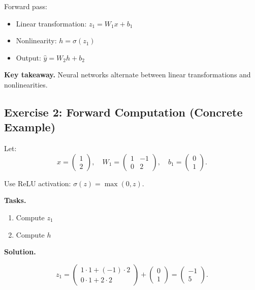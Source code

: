 \medskip

\noindent
Forward pass:
\begin{itemize}
    \item Linear transformation: $z_1 = W_1 x + b_1$
    \item Nonlinearity: $h = \sigma(z_1)$
    \item Output: $\hat{y} = W_2 h + b_2$
\end{itemize}

\medskip

\noindent
\textbf{Key takeaway.}  
Neural networks alternate between linear transformations and nonlinearities.

\subsection{Exercise 2: Forward Computation (Concrete Example)}

Let:
\[
x = \begin{pmatrix}1 \\ 2\end{pmatrix}, \quad
W_1 =
\begin{pmatrix}
1 & -1 \\
0 & 2
\end{pmatrix}, \quad
b_1 = \begin{pmatrix}0 \\ 1\end{pmatrix}.
\]

Use ReLU activation: $\sigma(z) = \max(0,z)$.

\medskip

\noindent
\textbf{Tasks.}
\begin{enumerate}
    \item Compute $z_1$
    \item Compute $h$
\end{enumerate}

\medskip

\noindent
\textbf{Solution.}

\[
z_1 =
\begin{pmatrix}
1\cdot1 + (-1)\cdot2 \\
0\cdot1 + 2\cdot2
\end{pmatrix}
+
\begin{pmatrix}0 \\ 1\end{pmatrix}
=
\begin{pmatrix}-1 \\ 5\end{pmatrix}.
\]

